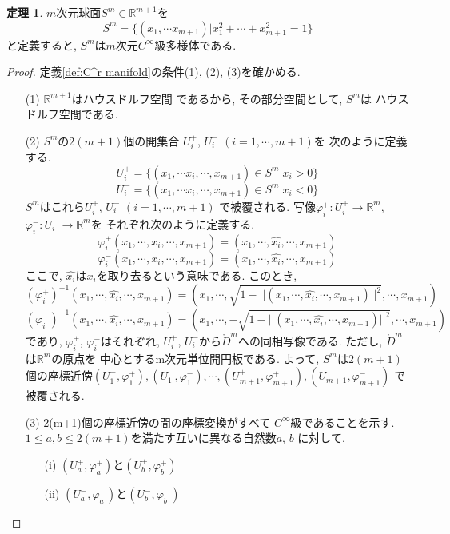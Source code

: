\documentclass[a4j,12pt]{jarticle}
\theoremstyle{definition}
\newtheorem{theorem}{定理}[section]
\begin{document}
\begin{theorem}
    $m$次元球面$S^m \in \mathbb{R}^{m+1}$を
    $$S^m=\{(x_1,\cdots x_{m+1})|x_1^2+\cdots +x_{m+1}^2=1\}$$
    と定義すると, $S^m$は$m$次元$C^{\infty}$級多様体である. 
\end{theorem}
\begin{proof}
    定義\ref{def:C^r manifold}の条件(1), (2), (3)を確かめる. 
    \begin{itemize}
        \item[(1)]$\mathbb{R}^{m+1}$はハウスドルフ空間
        であるから, その部分空間として, $S^m$は
        ハウスドルフ空間である. 
        \item[(2)]$S^m$の$2(m+1)$個の開集合
        $U_i^+$, $U_i^-$ $(i=1,\cdots ,m+1)$を
        次のように定義する. 
        $$U_i^+ = \{(x_1, \cdots x_i, \cdots ,x_{m+1})\in S^m|x_i>0\}$$
        $$U_i^- = \{(x_1, \cdots x_i, \cdots ,x_{m+1})\in S^m|x_i<0\}$$
        $S^m$はこれら$U_i^+$, $U_i^-$ $(i=1,\cdots ,m+1)$
        で被覆される. 写像$\varphi_i^+:U_i^+ \rightarrow \mathbb{R}^m$, 
        $\varphi_i^-:U_i^- \rightarrow \mathbb{R}^m$を
        それぞれ次のように定義する. 
        $$\varphi_i^+(x_1,\cdots ,x_i,\cdots, x_{m+1})=(x_1,\cdots ,\hat{x_i},\cdots ,x_{m+1})$$
        $$\varphi_i^-(x_1,\cdots ,x_i,\cdots, x_{m+1})=(x_1,\cdots ,\hat{x_i},\cdots ,x_{m+1})$$
        ここで, $\hat{x_i}$は$x_i$を取り去るという意味である. このとき, 
        $$(\varphi_i^+)^{-1}(x_1,\cdots ,\hat{x_i},\cdots ,x_{m+1})=(x_1,\cdots ,\sqrt{1-||(x_1,\cdots ,\hat{x_i},\cdots ,x_{m+1})||^2},\cdots ,x_{m+1})$$
        $$(\varphi_i^-)^{-1}(x_1,\cdots ,\hat{x_i},\cdots ,x_{m+1})=(x_1,\cdots ,-\sqrt{1-||(x_1,\cdots ,\hat{x_i},\cdots ,x_{m+1})||^2},\cdots ,x_{m+1})$$
        であり, $\varphi_i^+$, $\varphi_i^-$はそれぞれ, $U_i^+$, 
        $U_i^-$から$\mathring{D}^m$への同相写像である.
        ただし, $\mathring{D}^m$は$\mathbb{R}^m$の原点を
        中心とするm次元単位開円板である. 
        よって, $S^m$は$2(m+1)$個の座標近傍$(U_1^+,\varphi_1^+),
        (U_1^-,\varphi_1^-),\cdots ,(U_{m+1}^+,\varphi_{m+1}^+),(U_{m+1}^-,\varphi_{m+1}^-)$
        で被覆される. 
        \item[(3)]2(m+1)個の座標近傍の間の座標変換がすべて
        $C^{\infty}$級であることを示す. \\
        $1\leq a, b\leq 2(m+1)$を満たす互いに異なる自然数$a$, $b$
        に対して, 
        \begin{itemize}
            \item[(i)]$(U_a^+,\varphi_a^+)$と$(U_b^+,\varphi_b^+)$
            \item[(ii)]$(U_a^-,\varphi_a^-)$と$(U_b^-,\varphi_b^-)$

\end{itemize}
\end{itemize}
\end{proof}
\end{document}
